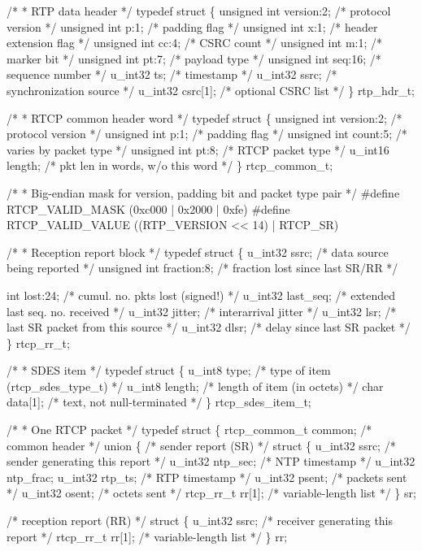 \documentclass{article}
\begin{document}
/* * RTP data header */ typedef struct \{ unsigned int version:2;   /* protocol version */ unsigned int p:1;         /* padding flag */ unsigned int x:1;         /* header extension flag */ unsigned int cc:4;        /* CSRC count */ unsigned int m:1;         /* marker bit */ unsigned int pt:7;        /* payload type */ unsigned int seq:16;      /* sequence number */ u\_int32 ts;               /* timestamp */ u\_int32 ssrc;             /* synchronization source */ u\_int32 csrc[1];          /* optional CSRC list */ \} rtp\_hdr\_t;

/* * RTCP common header word */ typedef struct \{ unsigned int version:2;   /* protocol version */ unsigned int p:1;         /* padding flag */ unsigned int count:5;     /* varies by packet type */ unsigned int pt:8;        /* RTCP packet type */ u\_int16 length;           /* pkt len in words, w/o this word */ \} rtcp\_common\_t;

/* * Big-endian mask for version, padding bit and packet type pair */ \#define RTCP\_VALID\_MASK (0xc000 | 0x2000 | 0xfe) \#define RTCP\_VALID\_VALUE ((RTP\_VERSION << 14) | RTCP\_SR)

/* * Reception report block */ typedef struct \{ u\_int32 ssrc;             /* data source being reported */ unsigned int fraction:8;  /* fraction lost since last SR/RR */

int lost:24;              /* cumul. no. pkts lost (signed!) */ u\_int32 last\_seq;         /* extended last seq. no. received */ u\_int32 jitter;           /* interarrival jitter */ u\_int32 lsr;              /* last SR packet from this source */ u\_int32 dlsr;             /* delay since last SR packet */ \} rtcp\_rr\_t;

/* * SDES item */ typedef struct \{ u\_int8 type;              /* type of item (rtcp\_sdes\_type\_t) */ u\_int8 length;            /* length of item (in octets) */ char data[1];             /* text, not null-terminated */ \} rtcp\_sdes\_item\_t;

/* * One RTCP packet */ typedef struct \{ rtcp\_common\_t common;     /* common header */ union \{ /* sender report (SR) */ struct \{ u\_int32 ssrc;     /* sender generating this report */ u\_int32 ntp\_sec;  /* NTP timestamp */ u\_int32 ntp\_frac; u\_int32 rtp\_ts;   /* RTP timestamp */ u\_int32 psent;    /* packets sent */ u\_int32 osent;    /* octets sent */ rtcp\_rr\_t rr[1];  /* variable-length list */ \} sr;

/* reception report (RR) */ struct \{ u\_int32 ssrc;     /* receiver generating this report */ rtcp\_rr\_t rr[1];  /* variable-length list */ \} rr;
\end{document}
